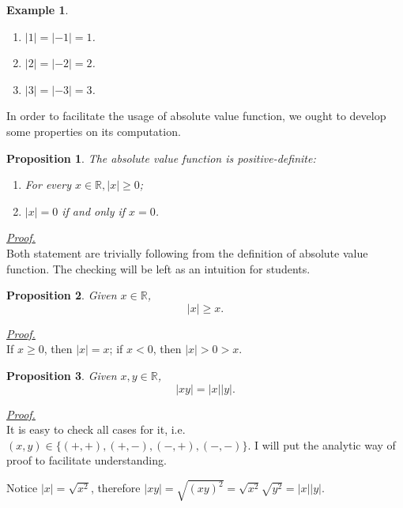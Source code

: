 \documentclass[12pt]{article}
\newtheorem*{proposition}{Proposition}
\newtheorem*{example}{Example}
\renewenvironment{proof}[1][Proof]{\begin{snugshade*} \underline{\textit{{#1}.}}\\}{\hfill \qedsymbol \end{snugshade*}}
\begin{document}
    \begin{example}
        \begin{enumerate}
            \item $|1|=|-1|=1$.
            \item $|2|=|-2|=2$.
            \item $|3|=|-3|=3$.
        \end{enumerate}
    \end{example}

    In order to facilitate the usage of absolute value function, we ought to develop some properties on its computation.

    \begin{proposition}
        The absolute value function is positive-definite: \begin{enumerate}
            \item  For every $x\in\mathbb{R}, |x|\geq 0$; 
            \item $|x|=0$ if and only if $x=0$.
        \end{enumerate}
    \end{proposition}

    \begin{proof}
        Both statement are trivially following from the definition of absolute value function. The checking will be left as an intuition for students.
    \end{proof}

    \begin{proposition}
        Given $x\in\mathbb{R}$, \[|x|\geq x.\]
    \end{proposition}

    \begin{proof}
        If $x\geq 0$, then $|x|=x$; if $x<0$, then $|x|>0>x$.
    \end{proof}

    \begin{proposition}
        Given $x,y\in\mathbb{R}$, \[|xy|=|x||y|.\]
    \end{proposition}

    \begin{proof}
        It is easy to check all cases for it, i.e. $(x,y)\in\{(+,+),(+,-),(-,+),(-,-)\}$. I will put the analytic way of proof to facilitate understanding.

        Notice $|x|=\sqrt{x^2}$, therefore $|xy|=\sqrt{(xy)^2}=\sqrt{x^2}\sqrt{y^2}=|x||y|$.
    \end{proof}
\end{document}

